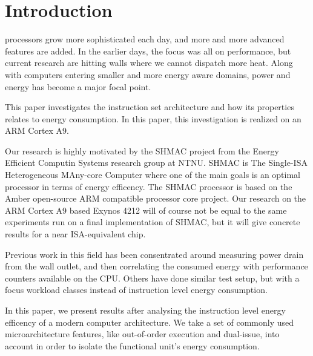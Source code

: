 \section{Introduction}

 processors grow more sophisticated each day, and more
and more advanced features are added. In the earlier days, the focus was all on
performance, but current research are hitting walls where we cannot dispatch more heat.
Along with computers entering smaller and more energy aware domains, power and
energy has become a major focal point\cite{patterson}\cite{hennessy}.

This paper investigates the instruction set architecture and how its properties
relates to energy consumption. In this paper, this investigation is realized on
an ARM Cortex A9.

Our research is highly motivated by the SHMAC project from the Energy Efficient
Computin Systems research group at NTNU. SHMAC is The Single-ISA Heterogeneous
MAny-core Computer where one of the main goals is an optimal processor in terms
of energy efficency. The SHMAC processor is based on the Amber open-source ARM
compatible processor core project. Our research on the ARM Cortex A9
based Exynos 4212 will of course not be equal to the same experiments run on
a final implementation of SHMAC, but it will give concrete results for a near
ISA-equivalent chip.

Previous work in this field has been consentrated around measuring power drain
from the wall outlet, and then correlating the consumed energy with performance
counters available on the CPU\cite{singh}\cite{bertran}\cite{bircher}. Others
have done similar test setup, but with a focus workload classes instead of
instruction level energy consumption\cite{carroll2010analysis}.

In this paper, we present results after analysing the instruction level energy
efficency of a modern computer architecture. We take a set of commonly used
microarchitecture features, like out-of-order execution and dual-issue, into
account in order to isolate the functional unit's energy consumption.


